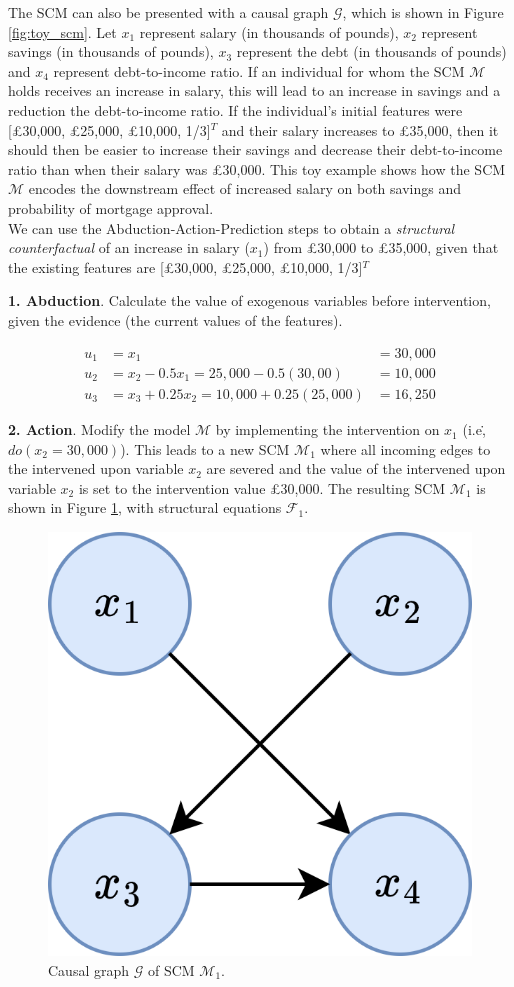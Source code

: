 The SCM can also be presented with a causal graph $\mathcal{G}$, which is shown in Figure \ref{fig:toy_scm}. Let $x_1$ represent salary (in thousands of pounds), $x_2$ represent savings (in thousands of pounds), $x_3$ represent the debt (in thousands of pounds) and $x_4$ represent debt-to-income ratio. If an individual for whom the SCM $\mathcal{M}$ holds receives an increase in salary, this will lead to an increase in savings and a reduction the debt-to-income ratio. If the individual's initial features were [£30,000, £25,000, £10,000, 1/3]$^T$ and their salary increases to £35,000, then it should then be easier to increase their savings and decrease their debt-to-income ratio than when their salary was £30,000. This toy example shows how the SCM $\mathcal{M}$ encodes the downstream effect of increased salary on both savings and probability of mortgage approval.\\

We can use the Abduction-Action-Prediction steps \citep{pearl2016causal} to obtain a \textit{structural counterfactual} of an increase in salary ($x_1$) from £30,000 to £35,000, given that the existing features are [£30,000, £25,000, £10,000, 1/3]$^T$

\textbf{1. Abduction}. Calculate the value of exogenous variables before intervention, given the evidence (the current values of the features).

\begin{align}
	u_1 & = x_1 & =  30,000 \\ \nonumber
	u_2 & = x_2 - 0.5x_1 = 25,000 - 0.5(30,00) & = 10,000 \\ \nonumber
	u_3 & = x_3 + 0.25x_2 = 10,000 + 0.25(25,000) & = 16,250
\end{align}

\textbf{2. Action}. Modify the model $\mathcal{M}$ by implementing the intervention on $x_1$ (i.e\., $do(x_2=30,000)$). This leads to a new SCM $\mathcal{M}_1$ where all incoming edges to the intervened upon variable $x_2$ are severed and the value of the intervened upon variable $x_2$ is set to the intervention value £30,000. The resulting SCM $\mathcal{M}_1$ is shown in Figure \ref{fig:toy_scm_severed}, with structural equations $\mathcal{F}_1$.

\begin{figure}[!htb]
	\centering
	\includegraphics[width=0.25\linewidth]{images/draw.io/Simple SCM Severed.png}
	\caption{Causal graph $\mathcal{G}$ of SCM $\mathcal{M}_1$.}
	\label{fig:toy_scm_severed}
\end{figure}

